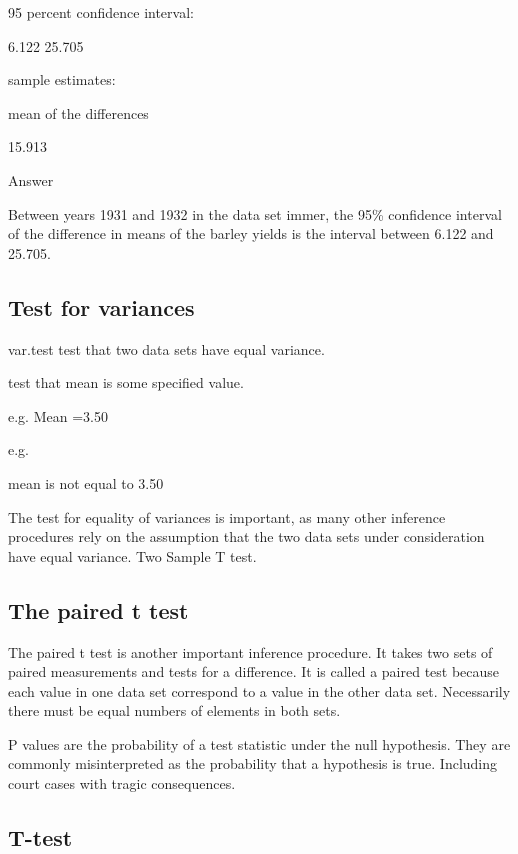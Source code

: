 95 percent confidence interval: 

 6.122 25.705 

sample estimates: 

mean of the differences 

                15.913

Answer

Between years 1931 and 1932 in the data set immer, the 95\% confidence interval of the difference in means of the barley yields is the interval between 6.122 and 25.705.

\subsection{Test for variances}


var.test test that two data sets have equal variance.


test that mean is some specified value. 


e.g. Mean =3.50

e.g. 

mean is not equal to 3.50 


The test for equality of variances is important, as many other inference procedures rely on the assumption that the two data sets under consideration have equal variance. Two Sample T test.

\subsection{The paired t test }

The paired t test is another important inference procedure. It takes two sets of paired measurements and tests for a difference. It is called a paired test because each value in one data set  correspond to a value in the other data set. Necessarily there must be equal numbers of elements in both sets.


P values are the probability of a test statistic under the null hypothesis. They are commonly misinterpreted as the probability that a hypothesis is true. Including court cases with tragic consequences.




\subsection{T-test}


